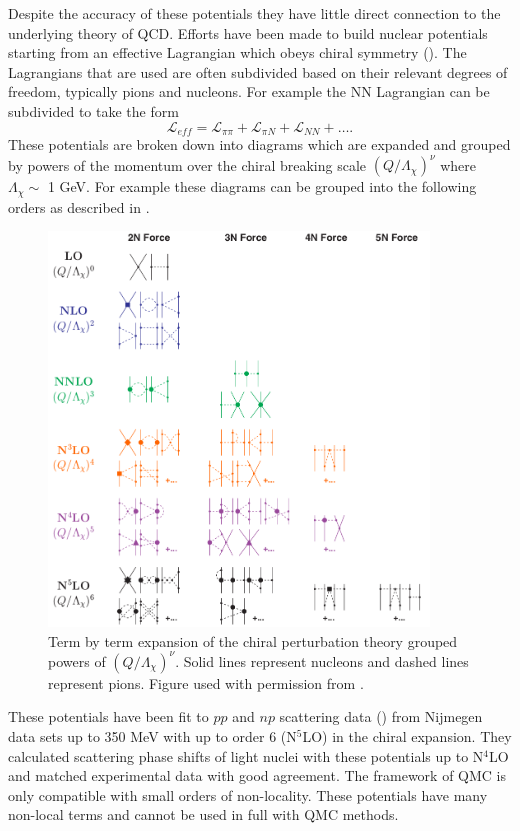 Despite the accuracy of these potentials they have little direct connection to the underlying theory of QCD. Efforts have been made to build nuclear potentials starting from an effective Lagrangian which obeys chiral symmetry (\cite{entem2017}). The Lagrangians that are used are often subdivided based on their relevant degrees of freedom, typically pions and nucleons. For example the NN Lagrangian can be subdivided to take the form
\begin{equation}
   \mathcal{L}_{eff} = \mathcal{L}_{\pi\pi} + \mathcal{L}_{\pi N} + \mathcal{L}_{NN} + \ldots.
\end{equation}
These potentials are broken down into diagrams which are expanded and grouped by powers of the momentum over the chiral breaking scale $(Q/\Lambda_\chi)^\nu$ where $\Lambda_\chi \sim$ 1 GeV. For example these diagrams can be grouped into the following orders as described in \cite{entem2017}.
\begin{figure}[h!]
   \centering
   \includegraphics[width=0.9\textwidth]{figures/chi_expansion.png}
   \caption{Term by term expansion of the chiral perturbation theory grouped powers of $(Q/\Lambda_\chi)^\nu$. Solid lines represent nucleons and dashed lines represent pions. Figure used with permission from \cite{entem2017}.}
\end{figure}
These potentials have been fit to $pp$ and $np$ scattering data (\cite{stoks1993,stoks1993_2}) from Nijmegen data sets up to 350 MeV with up to order 6 (N$^5$LO) in the chiral expansion. They calculated scattering phase shifts of light nuclei with these potentials up to N$^4$LO and matched experimental data with good agreement. The framework of QMC is only compatible with small orders of non-locality. These potentials have many non-local terms and cannot be used in full with QMC methods.

